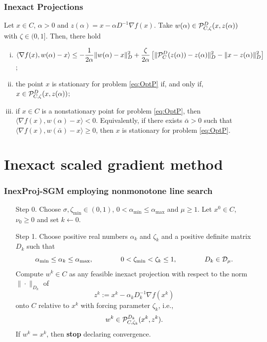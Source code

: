 \documentclass[xcolor=dvipsnames,aspectratio=169,13pt]{beamer} %
\begin{document}
\begin{frame}[t]\frametitle{Inexact Projections}
  \begin{lemma}
    Let $x \in C$, $\alpha > 0$ and  $z(\alpha) = x-\alpha D^{-1} \nabla f(x)$. Take $w(\alpha) \in  {\cal P}_{C,\zeta}^{D}(x, z(\alpha))$ with $\zeta\in (0, 1]$. Then, there hold
    \begin{enumerate}[(i)]
      \item {\small $\displaystyle \langle \nabla f(x), w(\alpha) - x\rangle \leq -\frac{1}{2\alpha} \|w(\alpha) -x\|_{D}^2 +   \frac{\zeta}{2\alpha} \left[\| {\cal P}_{C}^{D}(z(\alpha))-z(\alpha)\|_{D}^2 - \|x-z(\alpha)\|_{D}^2\right]$;}

      \item the point $x$ is stationary for problem \eqref{eq:OptP} if, and only if, $x \in {\cal P}_{C,\zeta}^{D}(x, z(\alpha))$;

      \item if  $x \in C$ is a nonstationary point for problem \eqref{eq:OptP}, then $\Big\langle \nabla f(x), w(\alpha) - x \Big\rangle < 0$. Equivalently, if there exists ${\bar \alpha}>0$ such that $\Big\langle \nabla f(x), w({\bar \alpha}) - x \Big\rangle \geq 0$, then $x$ is stationary for problem \eqref{eq:OptP}.
    \end{enumerate}
  \end{lemma}
\end{frame}


\section{Inexact scaled gradient method}

\begingroup
\small
\begin{frame}[t]
  \frametitle{InexProj-SGM employing nonmonotone line search}

  \begin{enumerate}
    \item[Step 0.] Choose  $\sigma,{\zeta_{\min}}  \in (0, 1)$, $0 < \alpha_{\min} \leq \alpha_{\max}$ and $\mu \geq1$. Let $x^0\in C$, $\nu_0\geq 0$ and set $k\gets0$.

    \item[Step 1.] Choose positive real numbers $\alpha_k$ and $\zeta_k$ and a positive definite matrix $D_k$ such that
      \begin{equation*} 
        \alpha_{\min}\leq \alpha_k \leq \alpha_{\max}, \qquad \qquad 0 <{\zeta_{\min}}<\zeta_k \leq 1, \qquad \qquad D_k\in {\cal D}_{\mu}.
      \end{equation*}
      Compute  $w^{k}\in C$  as any feasible inexact projection  with respect to the norm $\| \cdot \| _{D_k}$ of 
      \[
        z^k := x^{k}-\alpha_k D_k^{-1}\nabla f(x^{k})
      \]
      onto $C$ relative to $x^{k}$  with forcing parameter $\zeta_k$, i.e.,
      \begin{equation*} 
        w^k \in   {\cal P}_{C, \zeta_k}^{D_k}(x^{k}, z^k).
      \end{equation*}
      If $w^k= x^k$, then {\bf stop} declaring convergence.
  \end{enumerate}
\end{frame}
\endgroup
\end{document}
